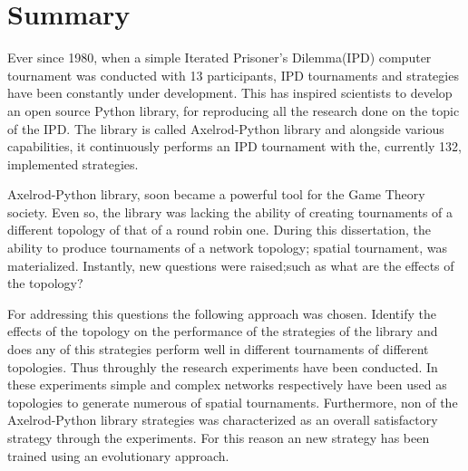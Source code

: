 \chapter{Summary}

Ever since 1980, when a simple Iterated Prisoner's Dilemma(IPD) computer
tournament was conducted with 13 participants, IPD tournaments and strategies
have been constantly under development. This has inspired scientists to develop
an open source Python library, for reproducing all the research done on the topic
of the IPD. The library is called Axelrod-Python library and alongside various
capabilities, it continuously performs an IPD tournament with the, currently 132,
implemented strategies.

Axelrod-Python library, soon became a powerful tool for the Game Theory society.
Even so, the library was lacking the ability of creating tournaments of a different
topology of that of a round robin one. During this dissertation, the ability to
produce tournaments of a network topology; spatial tournament, was materialized.
Instantly, new questions were raised;such as what are the effects of the topology?

For addressing this questions the following approach was chosen. Identify the
effects of the topology on the performance of the strategies of the library and
does any of this strategies perform well in different tournaments of different
topologies. Thus throughly the research experiments have been conducted. In these
experiments simple and complex networks respectively have been used as topologies
to generate numerous of spatial tournaments. Furthermore, non of the
Axelrod-Python library strategies was characterized as an overall satisfactory
strategy through the experiments. For this reason an new strategy has been trained
using an evolutionary approach.
